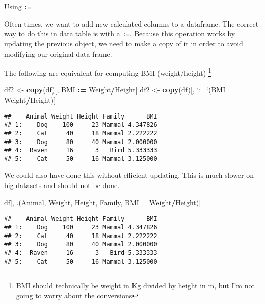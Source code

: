 \documentclass[ignorenonframetext,]{beamer}
\newenvironment{Shaded}{\begin{snugshade}}{\end{snugshade}}
\newcommand{\DataTypeTok}[1]{\textcolor[rgb]{0.13,0.29,0.53}{#1}}
\newcommand{\ErrorTok}[1]{\textcolor[rgb]{0.64,0.00,0.00}{\textbf{#1}}}
\newcommand{\KeywordTok}[1]{\textcolor[rgb]{0.13,0.29,0.53}{\textbf{#1}}}
\newcommand{\NormalTok}[1]{#1}
\newcommand{\OperatorTok}[1]{\textcolor[rgb]{0.81,0.36,0.00}{\textbf{#1}}}
\newcommand{\StringTok}[1]{\textcolor[rgb]{0.31,0.60,0.02}{#1}}
\begin{document}
\begin{frame}[fragile]{Using \texttt{:=}}
\protect\hypertarget{using}{}

Often times, we want to add new calculated columns to a dataframe. The
correct way to do this in data.table is with a \texttt{:=}. Because this
operation works by updating the previous object, we need to make a copy
of it in order to avoid modifying our original data frame.

The following are equivalent for computing BMI (weight/height)
\footnote{BMI
should technically be weight in Kg divided by height in m, but I'm not going to
worry about the conversions}

\begin{Shaded}
\begin{Highlighting}[]
\NormalTok{df2 <-}\StringTok{ }\KeywordTok{copy}\NormalTok{(df)[, BMI }\OperatorTok{:}\ErrorTok{=}\StringTok{ }\NormalTok{Weight}\OperatorTok{/}\NormalTok{Height]}
\NormalTok{df2 <-}\StringTok{ }\KeywordTok{copy}\NormalTok{(df)[, }\StringTok{`}\DataTypeTok{:=}\StringTok{`}\NormalTok{(}\DataTypeTok{BMI =}\NormalTok{ Weight}\OperatorTok{/}\NormalTok{Height)]}
\end{Highlighting}
\end{Shaded}

\begin{verbatim}
##    Animal Weight Height Family      BMI
## 1:    Dog    100     23 Mammal 4.347826
## 2:    Cat     40     18 Mammal 2.222222
## 3:    Dog     80     40 Mammal 2.000000
## 4:  Raven     16      3   Bird 5.333333
## 5:    Cat     50     16 Mammal 3.125000
\end{verbatim}

\end{frame}

\begin{frame}[fragile]

We could also have done this without efficient updating. This is much
slower on big datasets and should not be done.

\begin{Shaded}
\begin{Highlighting}[]
\NormalTok{df[, .(Animal, Weight, Height, Family,}
       \DataTypeTok{BMI =}\NormalTok{ Weight}\OperatorTok{/}\NormalTok{Height)]}
\end{Highlighting}
\end{Shaded}

\begin{verbatim}
##    Animal Weight Height Family      BMI
## 1:    Dog    100     23 Mammal 4.347826
## 2:    Cat     40     18 Mammal 2.222222
## 3:    Dog     80     40 Mammal 2.000000
## 4:  Raven     16      3   Bird 5.333333
## 5:    Cat     50     16 Mammal 3.125000
\end{verbatim}

\end{frame}
\end{document}
